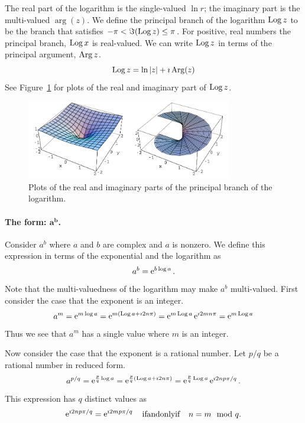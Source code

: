 The real part of the logarithm is the single-valued $\ln r$; 
the imaginary part is the multi-valued $\arg(z)$.
We define the principal branch of the logarithm $\mathop{\mathrm{Log}}\nolimits z$ to be the branch that 
satisfies $-\pi < \Im(\mathop{\mathrm{Log}}\nolimits z) \leq \pi$.  For positive, real numbers the
principal branch, $\mathop{\mathrm{Log}}\nolimits x$ is real-valued.  We can write $\mathop{\mathrm{Log}}\nolimits z$ in terms of
the principal argument, $\mathop{\mathrm{Arg}}\nolimits z$.
\[
\mathop{\mathrm{Log}}\nolimits z = \ln |z| + \imath \mathop{\mathrm{Arg}}\nolimits(z)
\]
See Figure~\ref{logreim} for plots of the real and imaginary part of 
$\mathop{\mathrm{Log}}\nolimits z$.

\begin{figure}[htbp!]
  \begin{center}
    \includegraphics[width=0.8\textwidth]{fcv/function/logreim}
  \end{center}
  \caption{Plots of the real and imaginary parts of the principal branch of
    the logarithm.}
  \label{logreim}
\end{figure}







\paragraph{The form: $\mathbf{a^b}$.}
Consider $a^b$ where $a$ and $b$ are complex and $a$ is nonzero.  We define
this expression in terms of the exponential and the logarithm as
\[
a^b = \mathop{\mathrm{e}}\nolimits^{b \log a}.
\]
Note that the multi-valuedness of the logarithm may make $a^b$ multi-valued.
First consider the case that the exponent is an integer.
\[
a^m = \mathop{\mathrm{e}}\nolimits^{m \log a} = \mathop{\mathrm{e}}\nolimits^{m (\mathop{\mathrm{Log}}\nolimits a + \imath 2 n \pi)}
= \mathop{\mathrm{e}}\nolimits^{m \mathop{\mathrm{Log}}\nolimits a} \mathop{\mathrm{e}}\nolimits^{\imath 2 m n \pi} = \mathop{\mathrm{e}}\nolimits^{m \mathop{\mathrm{Log}}\nolimits a}
\]
Thus we see that $a^m$ has a single value where $m$ is an integer.

Now consider the case that the exponent is a rational number.  Let 
$p/q$ be a rational number in reduced form.
\[
a^{p/q} = \mathop{\mathrm{e}}\nolimits^{\frac{p}{q} \log a} = \mathop{\mathrm{e}}\nolimits^{\frac{p}{q}  (\mathop{\mathrm{Log}}\nolimits a + \imath 2 n \pi)}
= \mathop{\mathrm{e}}\nolimits^{ \frac{p}{q} \mathop{\mathrm{Log}}\nolimits a} \mathop{\mathrm{e}}\nolimits^{\imath 2 n p \pi/q}.
\]
This expression has $q$ distinct values as
\[
\mathop{\mathrm{e}}\nolimits^{\imath 2 n p \pi / q} = \mathop{\mathrm{e}}\nolimits^{\imath 2 m p \pi / q} \quad \mathrm{if and only if} \quad
n = m \mod q.
\]

